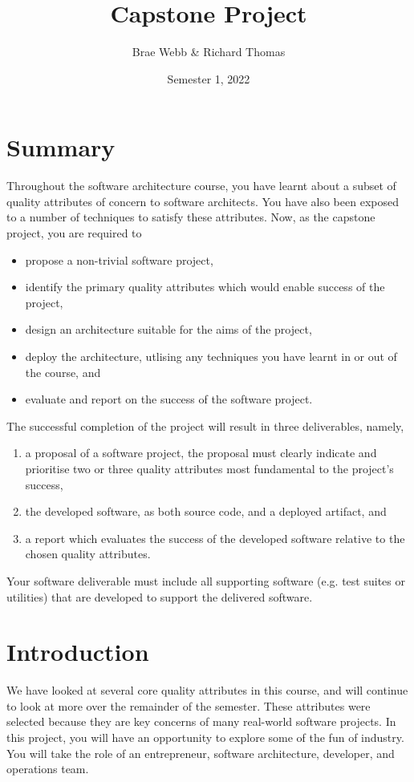 \documentclass{csse4400}
\title{Capstone Project}
\author{Brae Webb \& Richard Thomas}
\date{Semester 1, 2022}
\begin{document}
\maketitle

\section*{Summary}
Throughout the software architecture course,
you have learnt about a subset of quality attributes of concern to software architects.
You have also been exposed to a number of techniques to satisfy these attributes.
Now, as the capstone project, you are required to
\begin{itemize}
    \item propose a non-trivial software project,
    \item identify the primary quality attributes which would enable success of the project,
    \item design an architecture suitable for the aims of the project,
    \item deploy the architecture, utlising any techniques you have learnt in or out of the course, and
    \item evaluate and report on the success of the software project.
\end{itemize}

\noindent
The successful completion of the project will result in three deliverables, namely,
\begin{enumerate}[label=\roman*]
    \item a proposal of a software project, the proposal must clearly indicate and prioritise two or three quality attributes most {\color{red} fundamental} to the project's success,
    \item the developed software, as both source code, and a deployed artifact, and
    \item a report which evaluates the success of the developed software relative to the chosen quality attributes.
\end{enumerate}

\noindent
Your software deliverable must include all supporting software (e.g. test suites or utilities) that are developed to support the delivered software.

\section{Introduction}
We have looked at several core quality attributes in this course, and will continue to look at more over the remainder of the semester.
These attributes were selected because they are key concerns of many real-world software projects.
In this project, you will have an opportunity to explore some of the fun of industry.
You will take the role of an entrepreneur, software architecture, developer, and operations team.
\end{document}
